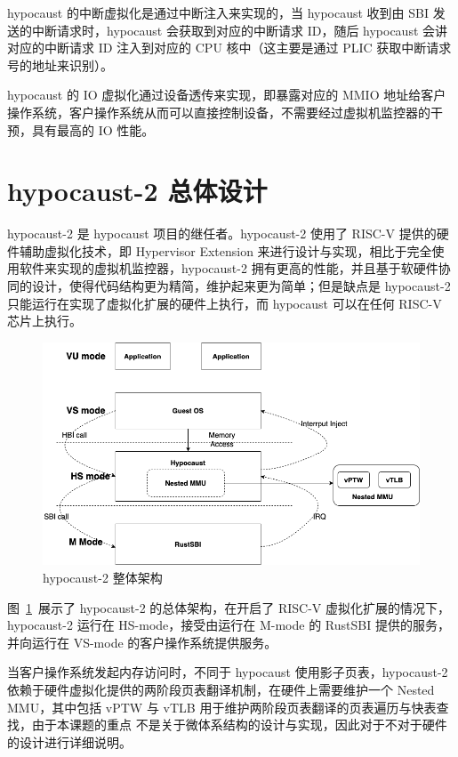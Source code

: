 hypocaust 的中断虚拟化是通过中断注入来实现的，当 hypocaust 收到由 SBI 发送的中断请求时，hypocaust 会获取到对应的中断请求 ID，随后 hypocaust 会讲对应的中断请求 ID 注入到对应的 CPU 核中（这主要是通过 PLIC 获取中断请求号的地址来识别）。

hypocaust 的 IO 虚拟化通过设备透传来实现，即暴露对应的 MMIO 地址给客户操作系统，客户操作系统从而可以直接控制设备，不需要经过虚拟机监控器的干预，具有最高的 IO 性能。
 


\section{hypocaust-2 总体设计}
hypocaust-2 是 hypocaust 项目的继任者。hypocaust-2 使用了 RISC-V 提供的硬件辅助虚拟化技术，即 Hypervisor Extension 来进行设计与实现，相比于完全使用软件来实现的虚拟机监控器，hypocaust-2 拥有更高的性能，并且基于软硬件协同的设计，使得代码结构更为精简，维护起来更为简单；但是缺点是 hypocaust-2 只能运行在实现了虚拟化扩展的硬件上执行，而 hypocaust 可以在任何 RISC-V 芯片上执行。

\begin{figure}[]
    \centering
    \includegraphics[width=1\textwidth]{thesis-images/hypocaust-2-arch.png}
    \caption{hypocaust-2 整体架构}\label{fig:hypocaust-2-arch}
\end{figure}

图~\ref{fig:hypocaust-2-arch}~展示了 hypocaust-2 的总体架构，在开启了 RISC-V 虚拟化扩展的情况下，hypocaust-2 运行在 HS-mode，接受由运行在 M-mode 的 RustSBI 提供的服务，并向运行在 VS-mode 的客户操作系统提供服务。

当客户操作系统发起内存访问时，不同于 hypocaust 使用影子页表，hypocaust-2 依赖于硬件虚拟化提供的两阶段页表翻译机制，在硬件上需要维护一个 Nested MMU，其中包括 vPTW 与 vTLB 用于维护两阶段页表翻译的页表遍历与快表查找，由于本课题的重点
不是关于微体系结构的设计与实现，因此对于不对于硬件的设计进行详细说明。

